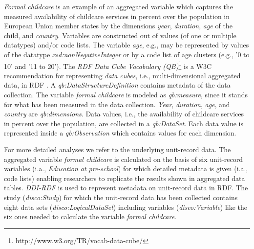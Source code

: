 \documentclass[conference]{IEEEtran}
\newcommand{\ke}[1]{\todo[size=\small, color=red!40]{\textbf{Kai:} #1}}
\newcommand{\tb}[1]{\todo[size=\small, color=green!40]{\textbf{Thomas:} #1}}
\begin{document}
\emph{Formal childcare} is an example of an aggregated variable which captures the measured availability of childcare services in percent over the population in European Union member states by 
the dimensions \emph{year}, \emph{duration}, \emph{age} of the child, and \emph{country}.
Variables are constructed out of values (of one or multiple datatypes) and/or code lists.
The variable \emph{age}, e.g., may be represented by values of the datatype \emph{xsd:nonNegativeInteger} or by a code list of age clusters (e.g., '0 to 10' and '11 to 20'). 
The \emph{RDF Data Cube Vocabulary (QB)}\footnote{http://www.w3.org/TR/vocab-data-cube/} is a W3C recommendation for representing \emph{data cubes}, i.e., multi-dimensional aggregated data, in RDF \cite{Cyganiak2010}. 
A \emph{qb:DataStructureDefinition} contains metadata of the data collection.
The variable \emph{formal childcare} is modeled as \emph{qb:measure}, since it stands for what has been measured in the data collection.
\emph{Year}, \emph{duration}, \emph{age}, and \emph{country} are \emph{qb:dimensions}.
Data values, i.e., the availability of childcare services in percent over the population, are collected in a \emph{qb:DataSet}. 
Each data value is represented inside a \emph{qb:Observation} which contains values for each dimension. 

For more detailed analyses we refer to the underlying unit-record data. The aggregated variable \emph{formal childcare} is calculated on the basis of six unit-record variables (i.a., \emph{Education at pre-school}) for which detailed metadata is given (i.a., code lists) enabling researchers to replicate the results shown in aggregated data tables.
\emph{DDI-RDF} is used to represent metadata on unit-record data in RDF.
The study (\emph{disco:Study}) for which the unit-record data has been collected 
contains eight data sets (\emph{disco:LogicalDataSet})
including variables (\emph{disco:Variable}) like the six ones needed to calculate the variable \emph{formal childcare}.
\end{document}
